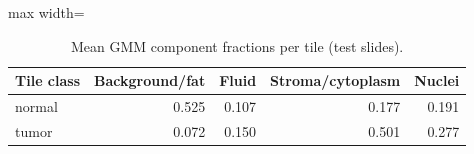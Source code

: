 \begin{table}[H]\centering\small
\caption{Mean GMM component fractions per tile (test slides).}\label{tab:components}
\begin{adjustbox}{max width=\linewidth}\begin{tabular}{lrrrr}\toprule
\textbf{Tile class} & \textbf{Background/fat} & \textbf{Fluid} & \textbf{Stroma/cytoplasm} & \textbf{Nuclei} \\\midrule
normal & 0.525 & 0.107 & 0.177 & 0.191 \\
tumor & 0.072 & 0.150 & 0.501 & 0.277 \\
\bottomrule\end{tabular}\end{adjustbox}\end{table}